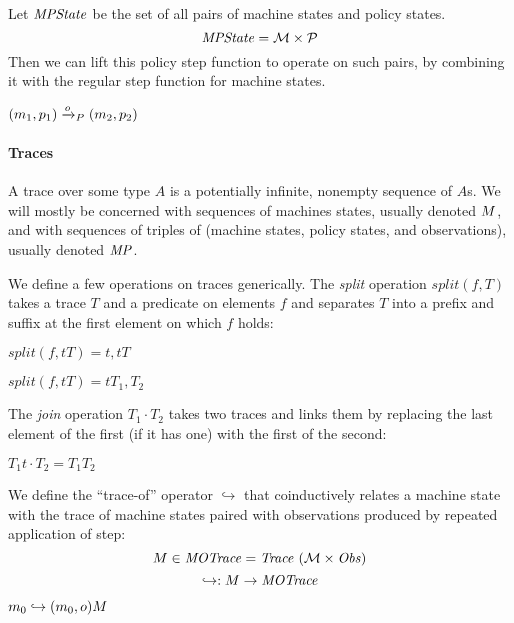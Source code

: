 \documentclass[acmsmall,review,anonymous]{acmart}\settopmatter{printfolios=true,printccs=false,printacmref=false}
\begin{document}
Let $\mathit{MPState}$ be the set of all pairs of machine states and policy states.
%
\[\mathit{MPState} = {\mathcal M} \times \mathcal{P}\]
%
Then we can lift this policy step function to operate on such pairs,
by combining it with the regular step function for machine states.


           {\((m_1,p_1) \xrightarrow{o}_P (m_2,p_2)\)}


\paragraph{Traces}

A trace over some type $A$ is a potentially infinite, nonempty
sequence of $A$s. We will mostly be concerned with sequences of
machines states, usually denoted $M$, and with sequences of
triples of (machine states, policy states, and observations), usually
denoted $\mathit{MP}$.

We define a few operations on traces generically.
The {\it split} operation \(\mathit{split}(f,T)\) takes a trace \(T\) and a predicate on elements \(f\) and
separates \(T\) into a prefix and suffix at the first element on which \(f\) holds:

           {\(\mathit{split}(f,tT) = t, tT\)}
  
              {\(\mathit{split}(f,tT) = tT_1,T_2\)}

The {\it join} operation \(T_1 \cdot T_2\) takes two traces and links them by replacing the last element
of the first (if it has one) with the first of the second:
  
  \judgment{}
           {\(T_1t \cdot T_2 = T_1 T_2\)}

We define the ``trace-of'' operator \(\hookrightarrow\) that coinductively
relates a machine state with the trace of machine states paired with
observations produced by repeated application of step:
\[M \in \mathit{MOTrace} = \mathit{Trace}\ ({\mathcal M} \times \mathit{Obs})\]
\[\hookrightarrow : M \rightarrow \mathit{MOTrace}\]

            {\(m_0 \hookrightarrow (m_0,o) M\)}
\end{document}
